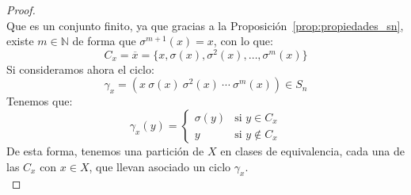 \begin{teo}
\begin{proof}
\begin{equation*}
        \end{equation*}
        Que es un conjunto finito, ya que gracias a la Proposición~\ref{prop:propiedades_sn}, existe $m\in \mathbb{N}$ de forma que $\sigma^{m+1}(x)=x$, con lo que:
        \begin{equation*}
            C_x = \overline{x} = \{x, \sigma(x), \sigma^2(x), \ldots, \sigma^{m}(x)\}
        \end{equation*}
        Si consideramos ahora el ciclo:
        \begin{equation*}
            \gamma_x = (x\ \sigma(x)\ \sigma^2(x)\ \cdots\ \sigma^m(x)) \in S_n
        \end{equation*} 
        Tenemos que:
        \begin{equation*}
            \gamma_x(y) = \left\{\begin{array}{cr}
                    \sigma(y) & \text{si\ } y \in C_x \\
                    y & \text{si\ } y\notin C_x
            \end{array}\right.
        \end{equation*}
        De esta forma, tenemos una partición de $X$ en clases de equivalencia, cada una de las $C_x$ con $x\in X$, que llevan asociado un ciclo $\gamma_x$.\\


\end{proof}
\end{teo}

